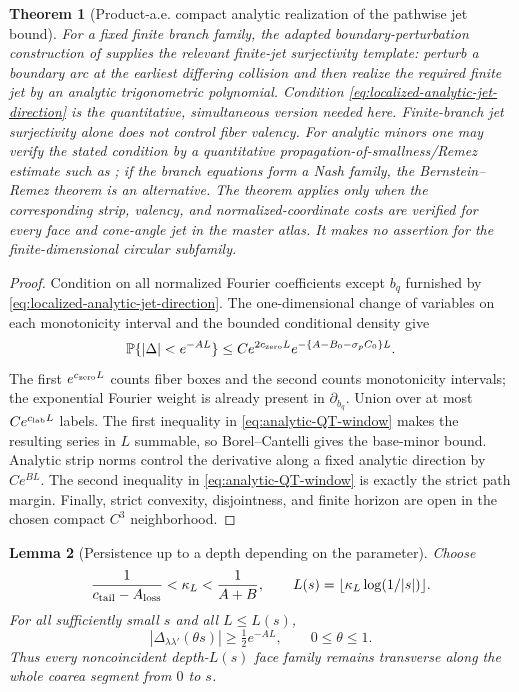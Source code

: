 \documentclass[11pt]{article}
\newtheorem{theorem}{Theorem}[section]
\newtheorem{lemma}[theorem]{Lemma}
\begin{document}
\begin{theorem}[Product-a.e. compact analytic realization of the pathwise jet bound]
For a fixed finite branch family, the adapted boundary-perturbation
construction of \cite{BFLS2026} supplies the relevant finite-jet
surjectivity template: perturb a boundary arc at the earliest differing
collision and then realize the required finite jet by an analytic
trigonometric polynomial.  Condition
\eqref{eq:localized-analytic-jet-direction} is the quantitative, simultaneous
version needed here.  Finite-branch jet surjectivity alone does not control
fiber valency.  For analytic minors one may verify the stated condition by a
quantitative propagation-of-smallness/Remez estimate such as
\cite{HWWRemez}; if the branch equations form a Nash family, the
Bernstein--Remez theorem \cite{BarbieriNash} is an alternative.  The theorem
applies only when the corresponding strip, valency, and normalized-coordinate
costs are verified for every face and cone-angle jet in the master atlas.  It
makes no assertion for the finite-dimensional circular subfamily.
\end{theorem}

\begin{proof}
Condition on all normalized Fourier coefficients except $b_q$ furnished
by \eqref{eq:localized-analytic-jet-direction}.  The one-dimensional change
of variables on each monotonicity interval and the bounded conditional density
give
\[
 \mathbb P\{|\Delta|<e^{-AL}\}
 \le C e^{2c_{\rm zero}L}
 e^{-\{A-B_0-\sigma_pC_0\}L}.
\]
The first $e^{c_{\rm zero}L}$ counts fiber boxes and the second counts
monotonicity intervals; the exponential Fourier weight is already present in
$\partial_{b_q}$.  Union over at most $Ce^{c_{\rm lab}L}$ labels.  The first inequality
in \eqref{eq:analytic-QT-window} makes the resulting series in $L$
summable, so Borel--Cantelli gives the base-minor bound.  Analytic strip norms
control the derivative along a fixed analytic direction by $Ce^{BL}$.
The second inequality in \eqref{eq:analytic-QT-window} is exactly the strict
path margin.  Finally, strict convexity, disjointness, and finite horizon are
open in the chosen compact $C^3$ neighborhood.
\end{proof}

\begin{lemma}[Persistence up to a depth depending on the parameter]
\label{lem:finite-depth-face-separation}
Choose
\begin{equation}
\label{eq:kappa-path-window}
 \frac1{c_{\rm tail}-A_{\rm loss}}<\kappa_L<\frac1{A+B},
 \qquad L(s)=\lfloor\kappa_L\log(1/|s|)\rfloor.
\end{equation}
For all sufficiently small $s$ and all $L\le L(s)$,
\[
 |\Delta_{\lambda\lambda'}(\theta s)|\ge\tfrac12e^{-AL},
 \qquad 0\le\theta\le1.
\]
Thus every noncoincident depth-$L(s)$ face family remains transverse along the
whole coarea segment from $0$ to $s$.
\end{lemma}
\end{document}
